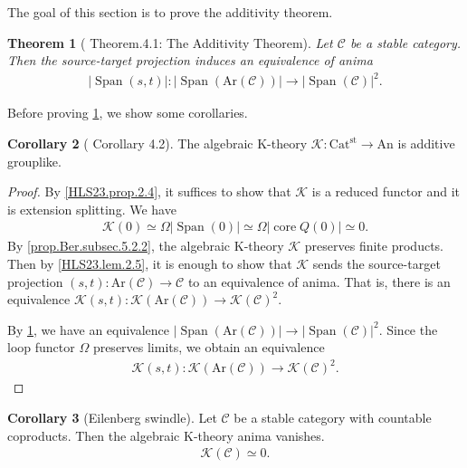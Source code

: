 \documentclass[a4paper,dvipdfmx,11pt,reqno]{amsart}
\newcommand{\C}{\mathcal{C}}
\newcommand{\K}{\mathcal{K}}
\DeclareMathOperator{\core}{core}
\DeclareMathOperator{\Span}{Span}
\newcommand{\An}{\mathrm{An}}
\newcommand{\Catst}{\mathrm{Cat^{st}}}
\newcommand{\Ar}{\mathrm{Ar}}
\newtheorem{theorem}{Theorem}[section]
\theoremstyle{definition}
\newtheorem{corollary}[theorem]{Corollary}
\begin{document}
The goal of this section is to prove the additivity theorem.

\begin{theorem}[\cite{HLS23} Theorem.4.1: The Additivity Theorem] \label{thrm.additivity_theorem}
  Let $\C$ be a stable category.
  Then the source-target projection induces an equivalence of anima 
  \begin{align*}
    |\Span(s,t)| : |\Span(\Ar(\C))| \to |\Span(\C)|^2.
  \end{align*}
\end{theorem}

Before proving \cref{thrm.additivity_theorem}, we show some corollaries.

\begin{corollary}[\cite{HLS23} Corollary 4.2] \label{HLS23.cor.3.2}
  The algebraic K-theory $\K : \Catst \to \An$ is additive grouplike.
\end{corollary}

\begin{proof}
  By \cref{HLS23.prop.2.4}, it suffices to show that $\K$ is a reduced functor and it is extension splitting.
  We have 
  \begin{align*}
    \K(0) \simeq \Omega|\Span(0)| \simeq \Omega|\core Q(0)| \simeq 0.
  \end{align*}
  By \cref{prop.Ber.subsec.5.2.2}, the algebraic K-theory $\K$ preserves finite products.
  Then by \cref{HLS23.lem.2.5}, it is enough to show that $\K$ sends the source-target projection $(s,t) : \Ar(\C) \to \C$ to an equivalence of anima.
  That is, there is an equivalence $\K(s,t) : \K(\Ar(\C)) \to \K(\C)^2$.
  
  By \cref{thrm.additivity_theorem}, we have an equivalence $|\Span(\Ar(\C))| \to |\Span(\C)|^2$.
  Since the loop functor $\Omega$ preserves limits, we obtain an equivalence
  \begin{align*}
    \K(s,t) : \K(\Ar(\C)) \to \K(\C)^2.
  \end{align*}
\end{proof}

\begin{corollary}[Eilenberg swindle] \label{Ber.prop.A.4}
  Let $\C$ be a stable category with countable coproducts.
  Then the algebraic K-theory anima vanishes.
  \begin{align*}
    \K(\C) \simeq 0.
  \end{align*}
\end{corollary}
\end{document}

